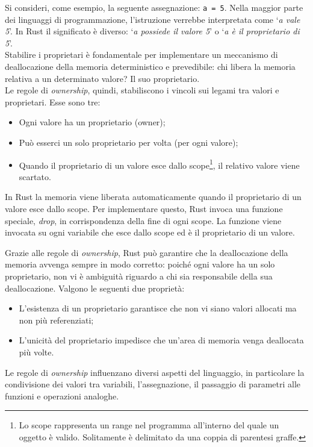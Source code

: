 Si consideri, come esempio, la seguente assegnazione: \texttt{a = 5}.
Nella maggior parte dei linguaggi di programmazione, l'istruzione verrebbe interpretata come `\textit{a vale 5}'. In Rust il significato è diverso: `\textit{a possiede il valore 5}' o `\textit{a è il proprietario di 5}'. \\
\indent Stabilire i proprietari è fondamentale per implementare un meccanismo di deallocazione della memoria deterministico e prevedibile: chi libera la memoria relativa a un determinato valore? Il suo proprietario. \hfill
\vspace{5pt}\\
\noindent Le regole di \textit{ownership}, quindi, stabiliscono i vincoli sui legami tra valori e proprietari. Esse sono tre:
\begin{itemize}
    \item Ogni valore ha un proprietario (owner);
    \item Può esserci un solo proprietario per volta (per ogni valore);
    \item Quando il proprietario di un valore esce dallo scope\footnote{Lo scope rappresenta un range nel programma all'interno del quale un oggetto è valido. Solitamente è delimitato da una coppia di parentesi graffe.}, il relativo valore viene scartato.
\end{itemize}

\noindent In Rust la memoria viene liberata automaticamente quando il proprietario di un valore esce dallo scope. Per implementare questo, Rust invoca una funzione speciale, \textit{drop}, in corrispondenza della fine di ogni scope. La funzione viene invocata su ogni variabile che esce dallo scope ed è il proprietario di un valore.

Grazie alle regole di \textit{ownership}, Rust può garantire che la deallocazione della memoria avvenga sempre in modo corretto: poiché ogni valore ha un solo proprietario, non vi è ambiguità riguardo a chi sia responsabile della sua deallocazione. Valgono le seguenti due proprietà:
\begin{itemize}
    \item L'esistenza di un proprietario garantisce che non vi siano valori allocati ma non più referenziati;
    \item L'unicità del proprietario impedisce che un'area di memoria venga deallocata più volte.
\end{itemize}

\noindent Le regole di \textit{ownership} influenzano diversi aspetti del linguaggio, in particolare la condivisione dei valori tra variabili, l'assegnazione, il passaggio di parametri alle funzioni e operazioni analoghe.

